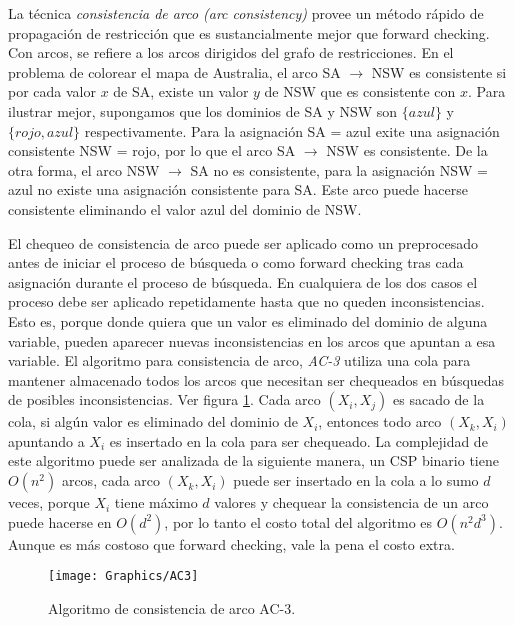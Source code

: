 La t\'ecnica \emph{consistencia de arco (arc consistency)} provee un m\'etodo r\'apido de propagaci\'on de restricci\'on que es sustancialmente mejor que forward checking. Con arcos, se refiere a los arcos dirigidos del grafo de restricciones. En el problema de colorear el mapa de Australia, el arco SA $\rightarrow$ NSW es consistente si por cada valor $x$ de SA, existe un valor $y$ de NSW que es consistente con $x$. Para ilustrar mejor, supongamos que los dominios de SA y NSW son $\{azul\}$ y $\{rojo, azul\}$ respectivamente. Para la asignaci\'on SA = azul exite una asignaci\'on consistente NSW = rojo, por lo que el arco SA $\rightarrow$ NSW es consistente. De la otra forma, el arco NSW $\rightarrow$ SA no es consistente, para la asignaci\'on NSW = azul no existe una asignaci\'on consistente para SA. Este arco puede hacerse consistente eliminando el valor azul del dominio de NSW.

El chequeo de consistencia de arco puede ser aplicado como un preprocesado antes de iniciar el proceso de b\'usqueda o como forward checking tras cada asignaci\'on durante el proceso de b\'usqueda. En cualquiera de los dos casos el proceso debe ser aplicado repetidamente hasta que no queden inconsistencias. Esto es, porque donde quiera que un valor es eliminado del dominio de alguna variable, pueden aparecer nuevas inconsistencias en los arcos que apuntan a esa variable. El algoritmo para consistencia de arco, \emph{AC-3} utiliza una cola para mantener almacenado todos los arcos que necesitan ser chequeados en b\'usquedas de posibles inconsistencias. Ver figura \ref{AC3}. Cada arco $(X_{i},X_{j})$ es sacado de la cola, si alg\'un valor es eliminado del dominio de $X_{i}$, entonces todo arco $(X_{k},X_{i})$ apuntando a $X_{i}$ es insertado en la cola para ser chequeado. La complejidad de este algoritmo puede ser analizada de la siguiente manera, un CSP binario tiene $O(n^{2})$ arcos, cada arco $(X_{k},X_{i})$ puede ser insertado en la cola a lo sumo $d$ veces, porque $X_{i}$ tiene m\'aximo $d$ valores y chequear la consistencia de un arco puede hacerse en $O(d^{2})$, por lo tanto el costo total del algoritmo es $O(n^{2}d^{3})$. Aunque es m\'as costoso que forward checking, vale la pena el costo extra.

\begin{figure}
	\begin{center}
		\texttt{[image: Graphics/AC3]}
		\caption{Algoritmo de consistencia de arco AC-3.}
		\label{AC3}
	\end{center}	
\end{figure}

